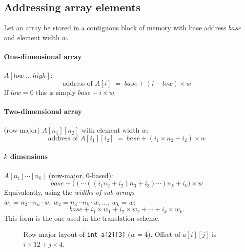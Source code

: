 \documentclass[11pt,a4paper]{article}
\begin{document}
\subsection{Addressing array elements}
Let an array be stored in a contiguous block of memory with base address $\mathit{base}$ and element width $w$.

\paragraph{One-dimensional array} $A[\mathit{low}\ \dots\ \mathit{high}]$:
\[
\text{address of } A[i] \;=\; \mathit{base} + (i - \mathit{low}) \times w
\]
If $\mathit{low}=0$ this is simply $\mathit{base} + i \times w$.

\paragraph{Two-dimensional array} (row-major) $A[n_1][n_2]$ with element width $w$:
\[
\text{address of } A[i_1][i_2] \;=\; \mathit{base} + (i_1 \times n_2 + i_2) \times w
\]
\paragraph{$k$ dimensions} $A[n_1]\cdots[n_k]$ (row-major, 0-based):
\[
\mathit{base} + \bigl( (\cdots((i_1 n_2 + i_2) n_3 + i_3) \cdots ) n_k + i_k \bigr)\times w
\]
Equivalently, using the \emph{widths of sub-arrays} $w_1 = n_2 \cdots n_k \cdot w,\ w_2 = n_3\cdots n_k \cdot w, \dots,\ w_k = w$:
\[
\mathit{base} + i_1 \times w_1 + i_2 \times w_2 + \cdots + i_k \times w_k.
\]
This form is the one used in the translation scheme.

\begin{figure}[htbp]
\centering
{}
\caption{Row-major layout of \texttt{int a[2][3]} ($w=4$). Offset of $a[i][j]$ is $i\times 12 + j\times 4$.}
\end{figure}
\end{document}

